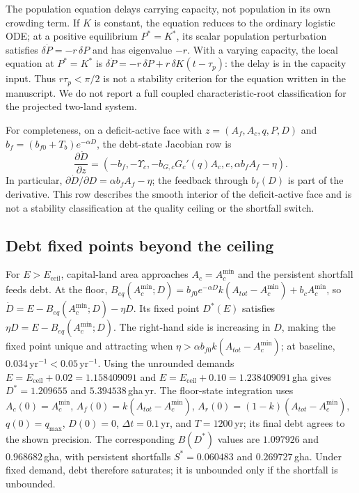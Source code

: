 \documentclass[11pt,a4paper]{article}
\newcommand{\Ups}{\Upsilon_c}
\newcommand{\Eceil}{E_{\mathrm{ceil}}}
\newcommand{\Acmin}{A_c^{\min}}
\begin{document}
The population equation delays carrying capacity, not population in its own crowding term. If $K$ is constant, the equation reduces to the ordinary logistic ODE; at a positive equilibrium $P^*=K^*$, its scalar population perturbation satisfies $\delta\dot P=-r\,\delta P$ and has eigenvalue $-r$. With a varying capacity, the local equation at $P^*=K^*$ is $\delta\dot P=-r\,\delta P+r\,\delta K(t-\tau_p)$: the delay is in the capacity input. Thus $r\tau_p<\pi/2$ is not a stability criterion for the equation written in the manuscript. We do not report a full coupled characteristic-root classification for the projected two-land system.

For completeness, on a deficit-active face with $z=(A_f,A_c,q,P,D)$ and $b_f=(b_{f0}+T_b)e^{-\alpha D}$, the debt-state Jacobian row is
\[
\frac{\partial\dot D}{\partial z}=\left(-b_f,-\Ups,-b_{G,c}G_c'(q)A_c,e,\alpha b_fA_f-\eta\right).
\]
In particular, $\partial\dot D/\partial D=\alpha b_fA_f-\eta$; the feedback through $b_f(D)$ is part of the derivative. This row describes the smooth interior of the deficit-active face and is not a stability classification at the quality ceiling or the shortfall switch.

\subsection{Debt fixed points beyond the ceiling}\label{si:debt}

For $E>\Eceil$, capital-land area approaches $A_c=\Acmin$ and the persistent shortfall feeds debt. At the floor, $B_{eq}(\Acmin;D)=b_{f0}e^{-\alpha D}k(A_{tot}-\Acmin)+b_c\Acmin$, so $\dot D=E-B_{eq}(\Acmin;D)-\eta D$. Its fixed point $D^*(E)$ satisfies $\eta D=E-B_{eq}(\Acmin;D)$. The right-hand side is increasing in $D$, making the fixed point unique and attracting when $\eta>\alpha b_{f0}k(A_{tot}-\Acmin)$; at baseline, $0.034\,\mathrm{yr}^{-1}<0.05\,\mathrm{yr}^{-1}$. Using the unrounded demands $E=E_{\mathrm{ceil}}+0.02=1.158409091$ and $E=E_{\mathrm{ceil}}+0.10=1.238409091$\,gha gives $D^*=1.209655$ and $5.394538$\,gha\,yr. The floor-state integration uses $A_c(0)=\Acmin$, $A_f(0)=k(A_{tot}-\Acmin)$, $A_r(0)=(1-k)(A_{tot}-\Acmin)$, $q(0)=q_{\max}$, $D(0)=0$, $\Delta t=0.1$\,yr, and $T=1200$\,yr; its final debt agrees to the shown precision. The corresponding $B(D^*)$ values are $1.097926$ and $0.968682$\,gha, with persistent shortfalls $S^*=0.060483$ and $0.269727$\,gha. Under fixed demand, debt therefore saturates; it is unbounded only if the shortfall is unbounded.
\end{document}
